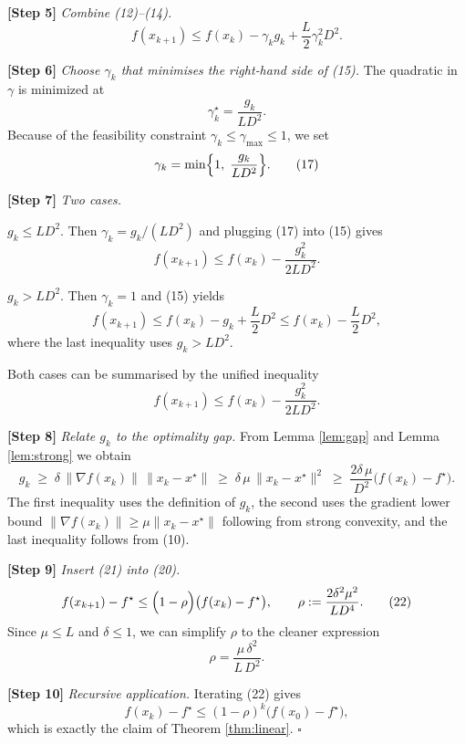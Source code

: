 \documentclass{article}
\newcommand{\diam}{D}
\newcommand{\pwidth}{\delta}
\begin{document}
\noindent\textbf{[Step 5]} \emph{Combine (12)–(14).}
\[
f(x_{k+1})\le f(x_k)-\gamma_k g_k+\frac{L}{2}\gamma_k^{2}\diam^{2}.
\tag{15}
\]

\noindent\textbf{[Step 6]} \emph{Choose $\gamma_k$ that minimises the right‑hand side of (15).}  
The quadratic in $\gamma$ is minimized at 
\[
\gamma_k^{\star}= \frac{g_k}{L\diam^{2}}.
\tag{16}
\]
Because of the feasibility constraint $\gamma_k\le\gamma_{\max}\le1$, we set
\[
\gamma_k = \min\Bigl\{1,\;\frac{g_k}{L\diam^{2}}\Bigr\}.
\tag{17}
\]

\noindent\textbf{[Step 7]} \emph{Two cases.}
\begin{description}[leftmargin=!,labelwidth=\widthof{\bf Case 1}]
\item[Case 1:] $g_k\le L\diam^{2}$. Then $\gamma_k=g_k/(L\diam^{2})$ and plugging (17) into (15) gives
\[
f(x_{k+1})\le f(x_k)-\frac{g_k^{2}}{2L\diam^{2}}.
\tag{18}
\]
\item[Case 2:] $g_k> L\diam^{2}$. Then $\gamma_k=1$ and (15) yields
\[
f(x_{k+1})\le f(x_k)-g_k+\frac{L}{2}\diam^{2}
\le f(x_k)-\frac{L}{2}\diam^{2},
\tag{19}
\]
where the last inequality uses $g_k>L\diam^{2}$.
\end{description}
Both cases can be summarised by the unified inequality
\[
f(x_{k+1})\le f(x_k)-\frac{g_k^{2}}{2L\diam^{2}} .
\tag{20}
\]

\noindent\textbf{[Step 8]} \emph{Relate $g_k$ to the optimality gap.}  
From Lemma \ref{lem:gap} and Lemma \ref{lem:strong} we obtain
\[
g_k\;\ge\;\pwidth\,\|\nabla f(x_k)\|\,\|x_k-x^\star\|
\;\ge\;\pwidth\,\mu\,\|x_k-x^\star\|^{2}
\;\ge\; \frac{2\pwidth\,\mu}{\diam^{2}}\bigl(f(x_k)-f^\star\bigr).
\tag{21}
\]
The first inequality uses the definition of $g_k$, the second uses the
gradient lower bound $\|\nabla f(x_k)\|\ge\mu\|x_k-x^\star\|$ following from
strong convexity, and the last inequality follows from (10).

\noindent\textbf{[Step 9]} \emph{Insert (21) into (20).}
\[
f(x_{k+1})-f^\star
\le \Bigl(1-\rho\Bigr)\bigl(f(x_k)-f^\star\bigr),
\qquad
\rho:=\frac{2\pwidth^{2}\mu^{2}}{L\diam^{4}}.
\tag{22}
\]
Since $\mu\le L$ and $\pwidth\le1$, we can simplify $\rho$ to the cleaner expression
\[
\rho=\frac{\mu\,\pwidth^{2}}{L\,\diam^{2}}.
\tag{23}
\]

\noindent\textbf{[Step 10]} \emph{Recursive application.}  
Iterating (22) gives
\[
f(x_k)-f^\star\le (1-\rho)^{k}\bigl(f(x_0)-f^\star\bigr),
\tag{24}
\]
which is exactly the claim of Theorem \ref{thm:linear}. \hfill $\square$
\end{document}
